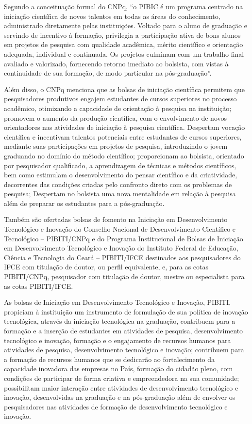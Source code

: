 Segundo a conceituação formal do CNPq, ``o PIBIC é um programa centrado na iniciação científica de novos talentos em todas as áreas do conhecimento, administrado diretamente pelas instituições. Voltado para o aluno de graduação e servindo de incentivo à formação, privilegia a participação ativa de bons alunos em projetos de pesquisa com qualidade acadêmica, mérito científico e orientação adequada, individual e continuada. Os projetos culminam com um trabalho final avaliado e valorizado, fornecendo retorno imediato ao bolsista, com vistas à continuidade de sua formação, de modo particular na pós-graduação''.

Além disso, o CNPq menciona que as bolsas de iniciação científica permitem que pesquisadores produtivos engajem estudantes de cursos superiores no processo acadêmico, otimizando a capacidade de orientação à pesquisa na instituição; promovem o aumento da produção científica, com o envolvimento de novos orientadores nas atividades de iniciação à pesquisa científica. Despertam vocação científica e incentivam talentos potenciais entre estudantes de cursos superiores, mediante suas participações em projetos de pesquisa, introduzindo o jovem graduando no domínio do método científico; proporcionam ao bolsista, orientado por pesquisador qualificado, a aprendizagem de técnicas e métodos científicos, bem como estimulam o desenvolvimento do pensar científico e da criatividade, decorrentes das condições criadas pelo confronto direto com os problemas de pesquisa; Despertam no bolsista uma nova mentalidade em relação à pesquisa além de preparar os estudantes para a pós-graduação.

Também são ofertadas bolsas de fomento na Iniciação em Desenvolvimento Tecnológico e Inovação do Conselho Nacional de Desenvolvimento Científico e Tecnológico – PIBITI/CNPq e do Programa Institucional de Bolsas de Iniciação em Desenvolvimento Tecnológico e Inovação do Instituto Federal de Educação, Ciência e Tecnologia do Ceará – PIBITI/IFCE destinados aos pesquisadores do IFCE com titulação de doutor, ou perfil equivalente, e, para as cotas PIBITI/CNPq, pesquisador com titulação de doutor, mestre ou especialista para as cotas PIBITI/IFCE.

As bolsas de Iniciação em Desenvolvimento Tecnológico e Inovação, PIBITI, propiciam à instituição um instrumento de formulação de sua política de inovação tecnológica, através da iniciação tecnológica na graduação, contribuem para a formação e a inserção de estudantes em atividades de pesquisa, desenvolvimento tecnológico e inovação, formação e o engajamento de recursos humanos para atividades de pesquisa, desenvolvimento tecnológico e inovação; contribuem para a formação de recursos humanos que se dedicarão ao fortalecimento da capacidade inovadora das empresas no País, formação do cidadão pleno, com condições de participar de forma criativa e empreendedora na sua comunidade; possibilitam maior interação entre atividades de desenvolvimento tecnológico e inovação, desenvolvidas na graduação e na pós-graduação além de envolver os pesquisadores nas atividades de formação de desenvolvimento tecnológico e inovação.

